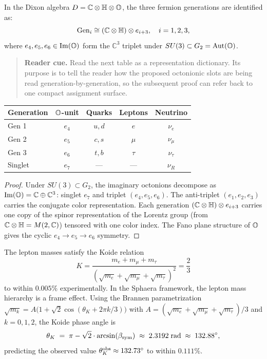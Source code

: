 \begin{theorem}
\label{thm:three-generations}
In the Dixon algebra $D=\mathbb{C}\otimes\mathbb{H}\otimes\mathbb{O}$, the three
fermion generations are identified as:
\[
  \mathrm{Gen}_i \cong (\mathbb{C}\otimes\mathbb{H})\otimes e_{i+3},
  \quad i=1,2,3,
\]
where $e_4,e_5,e_6\in\mathrm{Im}(\mathbb{O})$ form the $\mathbb{C}^3$ triplet
under $SU(3)\subset G_2=\mathrm{Aut}(\mathbb{O})$.
\begin{quote}\small
\noindent\textbf{Reader cue.} Read the next table as a representation dictionary. Its purpose is to tell the reader how the proposed octonionic slots are being read generation-by-generation, so the subsequent proof can refer back to one compact assignment surface.
\end{quote}
\begin{center}
\renewcommand{\arraystretch}{1.2}
{\small\setlength{\tabcolsep}{4pt}\begin{tabular}{@{}p{}cccc@{}}
\toprule
Generation & $\mathbb{O}$-unit & Quarks & Leptons & Neutrino\\
\midrule
Gen 1 & $e_4$ & $u,d$ & $e$ & $\nu_e$\\
Gen 2 & $e_5$ & $c,s$ & $\mu$ & $\nu_\mu$\\
Gen 3 & $e_6$ & $t,b$ & $\tau$ & $\nu_\tau$\\
Singlet & $e_7$ & --- & --- & $\nu_R$\\
\bottomrule
\end{tabular}}
\end{center}
\end{theorem}

\begin{proof}
Under $SU(3)\subset G_2$, the imaginary octonions decompose as
$\mathrm{Im}(\mathbb{O})=\mathbb{C}\oplus\mathbb{C}^3$: singlet $e_7$ and
triplet $(e_4,e_5,e_6)$.
The anti-triplet $(e_1,e_2,e_3)$ carries the conjugate color
representation.
Each generation $(\mathbb{C}\otimes\mathbb{H})\otimes e_{i+3}$ carries one
copy of the spinor representation of the Lorentz group (from
$\mathbb{C}\otimes\mathbb{H}=M(2,\mathbb{C})$) tensored with one color index.
The Fano plane structure of $\mathbb{O}$ gives the cyclic $e_4\to e_5\to e_6$
symmetry.
\end{proof}

\begin{theorem}
\label{thm:koide-triolic}
The lepton masses satisfy the Koide relation
\[
  K = \frac{m_e+m_\mu+m_\tau}{(\sqrt{m_e}+\sqrt{m_\mu}+\sqrt{m_\tau})^2}
    = \frac{2}{3}
\]
to within $0.005\%$ experimentally.
In the Sphaera framework, the lepton mass hierarchy is a frame effect.
Using the Brannen parametrization
$\sqrt{m_k} = A\bigl(1+\sqrt{2}\cos(\theta_K + 2\pi k/3)\bigr)$
with $A = (\sqrt{m_e}+\sqrt{m_\mu}+\sqrt{m_\tau})/3$
and $k=0,1,2$, the Koide phase angle is
\[
  \theta_K \;=\; \pi - \sqrt{2}\cdot\arcsin(\beta_{\mathrm{sym}}) \;\approx\; 2.3192\;\text{rad}
  \;\approx\; 132.88^\circ,
\]
predicting the observed value $\theta_K^{\rm obs}\approx 132.73^\circ$
to within $0.111\%$.
\end{theorem}

